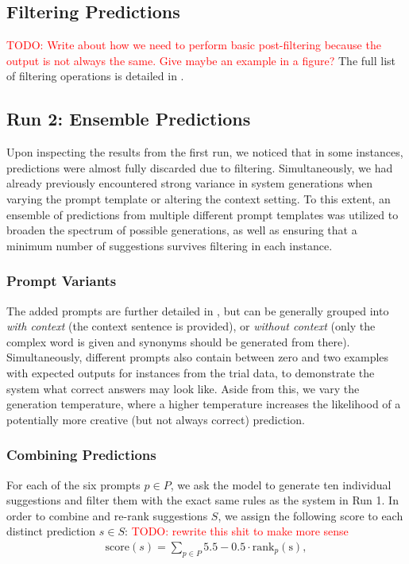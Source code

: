 \documentclass[11pt]{article}
\newcommand{\todo}[1]{\textcolor{red}{TODO: #1}}
\begin{document}
\subsection{Filtering Predictions}
\todo{Write about how we need to perform basic post-filtering because the output is not always the same. Give maybe an example in a figure?}
The full list of filtering operations is detailed in .

\subsection{Run 2: Ensemble Predictions}
Upon inspecting the results from the first run, we noticed that in some instances, predictions were almost fully discarded due to filtering.
Simultaneously, we had already previously encountered strong variance in system generations when varying the prompt template or altering the context setting.
To this extent, an ensemble of predictions from multiple different prompt templates was utilized to broaden the spectrum of possible generations, as well as ensuring that a minimum number of suggestions survives filtering in each instance.

\subsubsection{Prompt Variants}

The added prompts are further detailed in , but can be generally grouped into \emph{with context} (the context sentence is provided), or \emph{without context} (only the complex word is given and synonyms should be generated from there).
Simultaneously, different prompts also contain between zero and two examples with expected outputs for instances from the trial data, to demonstrate the system what correct answers may look like.
Aside from this, we vary the generation temperature, where a higher temperature increases the likelihood of a potentially more creative (but not always correct) prediction.

\subsubsection{Combining Predictions}

For each of the six prompts $p \in P$, we ask the model to generate ten individual suggestions and filter them with the exact same rules as the system in Run 1. In order to combine and re-rank suggestions $S$, we assign the following score to each distinct prediction $s \in S$:
\todo{rewrite this shit to make more sense}
\begin{align}
	\text{score}(s) = \sum_{p \in P} 5.5 - 0.5 \cdot \text{rank}_p(\text{s}),
\end{align}
\end{document}
